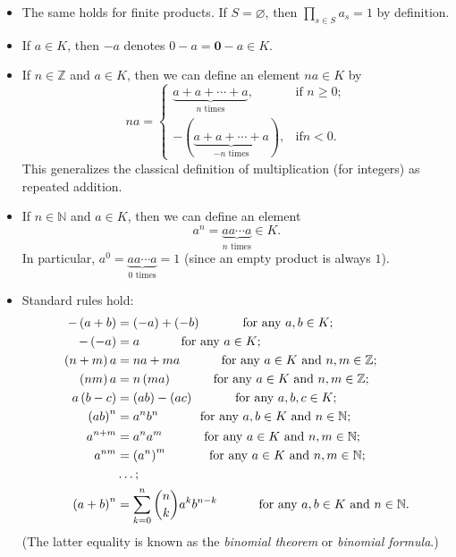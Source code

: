\begin{itemize}
\item The same holds for finite products. If $S=\varnothing$, then
$\prod\limits_{s\in S}a_{s}=1$ by definition.

\item If $a\in K$, then $-a$ denotes $0-a=\mathbf{0}-a\in K$.

\item If $n\in\mathbb{Z}$ and $a\in K$, then we can define an element $na\in
K$ by%
\[
na=%
\begin{cases}
\underbrace{a+a+\cdots+a}_{n\text{ times}}, & \text{if }n\geq0;\\
-\left(  \underbrace{a+a+\cdots+a}_{-n\text{ times}}\right)  , & \text{if
}n<0.
\end{cases}
\]
This generalizes the classical definition of multiplication (for integers) as
repeated addition.

\item If $n\in\mathbb{N}$ and $a\in K$, then we can define an element%
\[
a^{n}=\underbrace{aa\cdots a}_{n\text{ times}}\in K.
\]
In particular, $a^{0}=\underbrace{aa\cdots a}_{0\text{ times}}=1$ (since an
empty product is always $1$).

\item Standard rules hold:%
\begin{align*}
-\left(  a+b\right)   &  =\left(  -a\right)  +\left(  -b\right)
\ \ \ \ \ \ \ \ \ \ \text{for any }a,b\in K;\\
-\left(  -a\right)   &  =a\ \ \ \ \ \ \ \ \ \ \text{for any }a\in K;\\
\left(  n+m\right)  a  &  =na+ma\ \ \ \ \ \ \ \ \ \ \text{for any }a\in
K\text{ and }n,m\in\mathbb{Z};\\
\left(  nm\right)  a  &  =n\left(  ma\right)  \ \ \ \ \ \ \ \ \ \ \text{for
any }a\in K\text{ and }n,m\in\mathbb{Z};\\
a\left(  b-c\right)   &  =\left(  ab\right)  -\left(  ac\right)
\ \ \ \ \ \ \ \ \ \ \text{for any }a,b,c\in K;\\
\left(  ab\right)  ^{n}  &  =a^{n}b^{n}\ \ \ \ \ \ \ \ \ \ \text{for any
}a,b\in K\text{ and }n\in\mathbb{N};\\
a^{n+m}  &  =a^{n}a^{m}\ \ \ \ \ \ \ \ \ \ \text{for any }a\in K\text{ and
}n,m\in\mathbb{N};\\
a^{nm}  &  =\left(  a^{n}\right)  ^{m}\ \ \ \ \ \ \ \ \ \ \text{for any }a\in
K\text{ and }n,m\in\mathbb{N};\\
&  \ldots;\\
\left(  a+b\right)  ^{n}  &  =\sum_{k=0}^{n}\dbinom{n}{k}a^{k}b^{n-k}%
\ \ \ \ \ \ \ \ \ \ \text{for any }a,b\in K\text{ and }n\in\mathbb{N}.
\end{align*}
(The latter equality is known as the \emph{binomial theorem} or \emph{binomial
formula}.)
\end{itemize}

